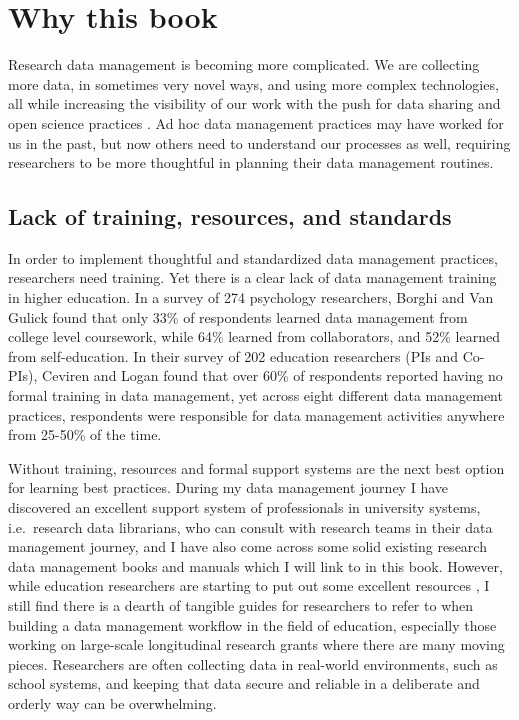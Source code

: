 \documentclass[
]{book}
\begin{document}
\hypertarget{why-this-book}{%
\section{Why this book}\label{why-this-book}}

Research data management is becoming more complicated. We are collecting more data, in sometimes very novel ways, and using more complex technologies, all while increasing the visibility of our work with the push for data sharing and open science practices \autocite{briney_data_2015}. Ad hoc data management practices may have worked for us in the past, but now others need to understand our processes as well, requiring researchers to be more thoughtful in planning their data management routines.

\hypertarget{lack-of-training-resources-and-standards}{%
\subsection{Lack of training, resources, and standards}\label{lack-of-training-resources-and-standards}}

In order to implement thoughtful and standardized data management practices, researchers need training. Yet there is a clear lack of data management training in higher education. In a survey of 274 psychology researchers, Borghi and Van Gulick \autocite{borghi_data_2021} found that only 33\% of respondents learned data management from college level coursework, while 64\% learned from collaborators, and 52\% learned from self-education. In their survey of 202 education researchers (PIs and Co-PIs), Ceviren and Logan \autocite{ceviren_ceviren_logan_ehe_forum_2022pdf_2022} found that over 60\% of respondents reported having no formal training in data management, yet across eight different data management practices, respondents were responsible for data management activities anywhere from 25-50\% of the time.

Without training, resources and formal support systems are the next best option for learning best practices. During my data management journey I have discovered an excellent support system of professionals in university systems, i.e.~research data librarians, who can consult with research teams in their data management journey, and I have also come across some solid existing research data management books and manuals which I will link to in this book. However, while education researchers are starting to put out some excellent resources \autocite{neild_sharing_2022,reynolds_basics_2022}, I still find there is a dearth of tangible guides for researchers to refer to when building a data management workflow in the field of education, especially those working on large-scale longitudinal research grants where there are many moving pieces. Researchers are often collecting data in real-world environments, such as school systems, and keeping that data secure and reliable in a deliberate and orderly way can be overwhelming.
\end{document}
